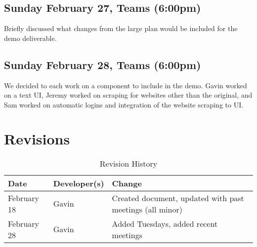 \documentclass{article}
\begin{document}
\subsection{Sunday February 27, Teams (6:00pm)}
Briefly discussed what changes from the large plan would be included for the demo deliverable. 

\subsection{Sunday February 28, Teams (6:00pm)}
We decided to each work on a component to include in the demo. Gavin worked on a text UI, Jeremy worked on scraping for websites other than the original, and Sam worked on automatic logins and integration of the website scraping to UI.

\newpage

\section{Revisions}

\begin{table}[hp]
\caption{Revision History} \label{tbl:rev}
\begin{tabularx}{\textwidth}{llX}
\toprule
\textbf{Date} & \textbf{Developer(s)} & \textbf{Change}\\
\midrule
February 18 & Gavin & Created document, updated with past meetings (all minor) \\
February 28 & Gavin & Added Tuesdays, added recent meetings \\
\bottomrule
\end{tabularx}
\end{table}
\end{document}
